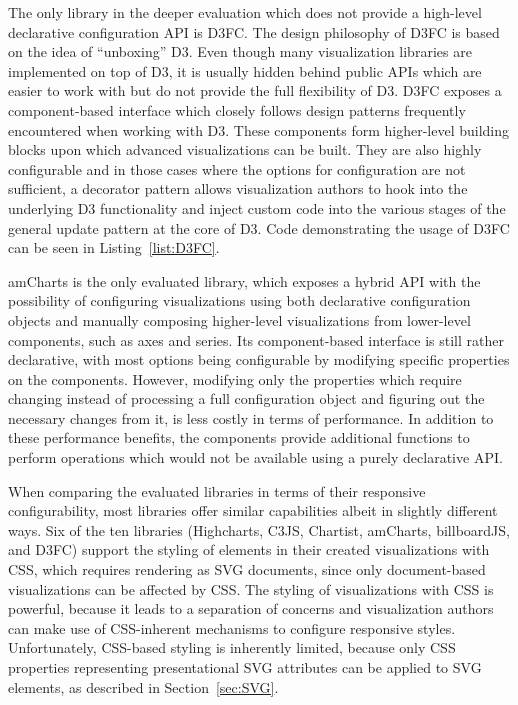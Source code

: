 The only library in the deeper evaluation which does not provide a
high-level declarative configuration API is D3FC. The design
philosophy of D3FC is based on the idea of \enquote{unboxing} D3. Even
though many visualization libraries are implemented on top of D3, it
is usually hidden behind public APIs which are easier to work with but
do not provide the full flexibility of D3. D3FC exposes a
component-based interface which closely follows design patterns
frequently encountered when working with D3. These components form
higher-level building blocks upon which advanced visualizations can be
built. They are also highly configurable and in those cases where the
options for configuration are not sufficient, a decorator pattern
allows visualization authors to hook into the underlying D3
functionality and inject custom code into the various stages of the
general update pattern at the core of D3. Code demonstrating the usage
of D3FC can be seen in Listing~\ref{list:D3FC}.


\begin{samepage}
%
A basic bar chart defined using D3FC's component-based API.
},
]{listings/d3fc.js}
\end{samepage}



amCharts is the only evaluated library, which exposes a hybrid API
with the possibility of configuring visualizations using both
declarative configuration objects and manually composing higher-level
visualizations from lower-level components, such as axes and series.
Its component-based interface is still rather declarative, with most
options being configurable by modifying specific properties on the
components. However, modifying only the properties which require
changing instead of processing a full configuration object and
figuring out the necessary changes from it, is less costly in terms of
performance. In addition to these performance benefits, the components
provide additional functions to perform operations which would not be
available using a purely declarative API.




When comparing the evaluated libraries in terms of their responsive
configurability, most libraries offer similar capabilities albeit in
slightly different ways. Six of the ten libraries (Highcharts, C3JS,
Chartist, amCharts, billboardJS, and D3FC) support the styling of
elements in their created visualizations with CSS, which requires
rendering as SVG documents, since only document-based visualizations
can be affected by CSS. The styling of visualizations with CSS is
powerful, because it leads to a separation of concerns and
visualization authors can make use of CSS-inherent mechanisms to
configure responsive styles. Unfortunately, CSS-based styling is
inherently limited, because only CSS properties representing
presentational SVG attributes can be applied to SVG elements, as
described in Section~\ref{sec:SVG}.

